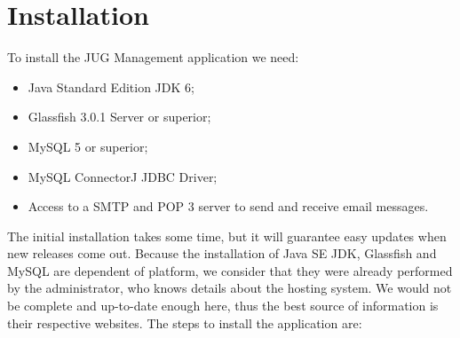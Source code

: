 \documentclass[envcountsame,envcountchap]{svmono}
\begin{document}
\chapter{Installation}

To install the JUG Management application we need:

\begin{itemize}
\item Java Standard Edition JDK 6;
\item Glassfish 3.0.1 Server or superior;
\item MySQL 5 or superior;
\item MySQL ConnectorJ JDBC Driver;
\item Access to a SMTP and POP 3 server to send and receive email messages.
\end{itemize}

The initial installation takes some time, but it will guarantee easy updates when new releases come out. Because the installation of Java SE JDK, Glassfish and MySQL are dependent of platform, we consider that they were already performed by the administrator, who knows details about the hosting system. We would not be complete and up-to-date enough here, thus the best source of information is their respective websites. The steps to install the application are:
\end{document}
